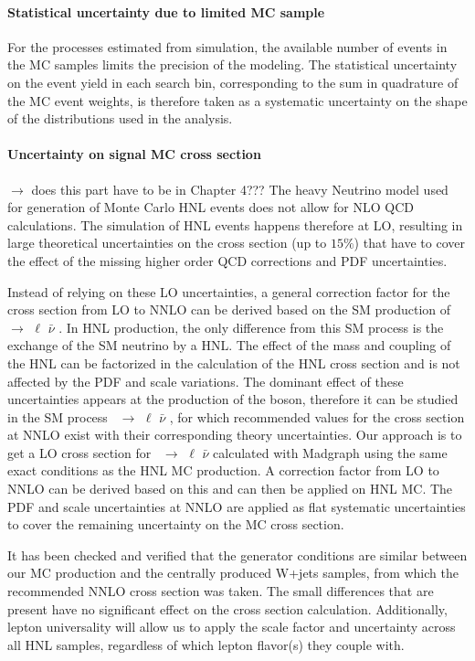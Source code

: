 \paragraph{Statistical uncertainty due to limited MC sample}
For the processes estimated from simulation, the available number of
events in the MC samples limits the precision of the modeling.
The statistical uncertainty on the event yield in each search bin,
corresponding to the sum in quadrature of the MC event weights, is
therefore taken as a systematic uncertainty on the shape of the
distributions used in the analysis.

\paragraph{Uncertainty on signal MC cross section}{\color{red}
  $\rightarrow$ does this part have to be in Chapter 4??? } 
The heavy Neutrino model used for generation of Monte Carlo HNL events does not allow for NLO QCD calculations. The simulation of HNL events happens therefore at LO, resulting in large theoretical uncertainties on the cross section (up to $15\%$) that have to cover the effect of the missing higher order QCD corrections and PDF uncertainties.

Instead of relying on these LO uncertainties, a general correction factor for the cross section from LO to NNLO can be derived based on the SM production of \PW\ $\rightarrow$ $\ell$ $\bar{\nu}$ . In HNL production, the only difference from this SM process is the exchange of the SM neutrino by a HNL. The effect of the mass and coupling of the HNL can be factorized in the calculation of the HNL cross section and is not affected by the PDF and scale variations. The dominant effect of these uncertainties appears at the production of the \PW boson, therefore it can be studied in the SM process \PW\ $\rightarrow$ $\ell$ $\bar{\nu}$ , for which recommended values for the cross section at NNLO exist with their corresponding theory uncertainties. Our approach is to get a LO cross section for \PW\ $\rightarrow$ $\ell$ $\bar{\nu}$ calculated with Madgraph using the same exact conditions as the HNL MC production. A correction factor from LO to NNLO can be derived based on this and can then be applied on HNL MC. The PDF and scale uncertainties at NNLO are applied as flat systematic uncertainties to cover the remaining uncertainty on the MC cross section.

It has been checked and verified that the generator conditions are similar between our MC production and the centrally produced W+jets samples, from which the recommended NNLO cross section was taken. The small differences that are present have no significant effect on the cross section calculation. Additionally, lepton universality will allow us to apply the scale factor and uncertainty across all HNL samples, regardless of which lepton flavor(s) they couple with.

